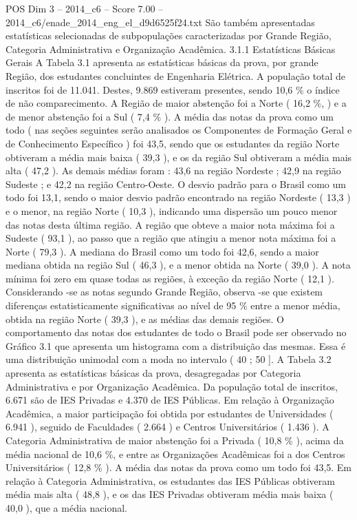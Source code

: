 \begin{textsample}{POS Dim 3 – 2014\_c6 – Score 7.00 – 2014\_c6/enade\_2014\_eng\_el\_d9d6525f24.txt}
São também apresentadas estatísticas selecionadas de subpopulações caracterizadas por Grande Região, Categoria Administrativa e Organização Acadêmica. 3.1.1 Estatísticas Básicas Gerais A Tabela 3.1 apresenta as estatísticas básicas da prova, por grande Região, dos estudantes concluintes de Engenharia Elétrica.
A população total de inscritos foi de 11.041.
Destes, 9.869 estiveram presentes, sendo 10,6 \% o índice de não comparecimento.
A Região de maior abstenção foi a Norte ( 16,2 \%, ) e a de menor abstenção foi a Sul ( 7,4 \% ).
A média das notas da prova como um todo ( nas seções seguintes serão analisados os Componentes de Formação Geral e de Conhecimento Específico ) foi 43,5, sendo que os estudantes da região Norte obtiveram a média mais baixa ( 39,3 ), e os da região Sul obtiveram a média mais alta ( 47,2 ).
As demais médias foram : 43,6 na região Nordeste ; 42,9 na região Sudeste ; e 42,2 na região Centro-Oeste.
O desvio padrão para o Brasil como um todo foi 13,1, sendo o maior desvio padrão encontrado na região Nordeste ( 13,3 ) e o menor, na região Norte ( 10,3 ), indicando uma dispersão um pouco menor das notas desta última região.
A região que obteve a maior nota máxima foi a Sudeste ( 93,1 ), ao passo que a região que atingiu a menor nota máxima foi a Norte ( 79,3 ).
A mediana do Brasil como um todo foi 42,6, sendo a maior mediana obtida na região Sul ( 46,3 ), e a menor obtida na Norte ( 39,0 ).
A nota mínima foi zero em quase todas as regiões, à exceção da região Norte ( 12,1 ).
Considerando -se as notas segundo Grande Região, observa -se que existem diferenças estatisticamente significativas ao nível de 95 \% entre a menor média, obtida na região Norte ( 39,3 ), e as médias das demais regiões.
O comportamento das notas dos estudantes de todo o Brasil pode ser observado no Gráfico 3.1 que apresenta um histograma com a distribuição das mesmas.
Essa é uma distribuição unimodal com a moda no intervalo ( 40 ; 50 ].
A Tabela 3.2 apresenta as estatísticas básicas da prova, desagregadas por Categoria Administrativa e por Organização Acadêmica.
Da população total de inscritos, 6.671 são de IES Privadas e 4.370 de IES Públicas.
Em relação à Organização Acadêmica, a maior participação foi obtida por estudantes de Universidades ( 6.941 ), seguido de Faculdades ( 2.664 ) e Centros Universitários ( 1.436 ).
A Categoria Administrativa de maior abstenção foi a Privada ( 10,8 \% ), acima da média nacional de 10,6 \%, e entre as Organizações Acadêmicas foi a dos Centros Universitários ( 12,8 \% ).
A média das notas da prova como um todo foi 43,5.
Em relação à Categoria Administrativa, os estudantes das IES Públicas obtiveram média mais alta ( 48,8 ), e os das IES Privadas obtiveram média mais baixa ( 40,0 ), que a média nacional.

\end{textsample}
